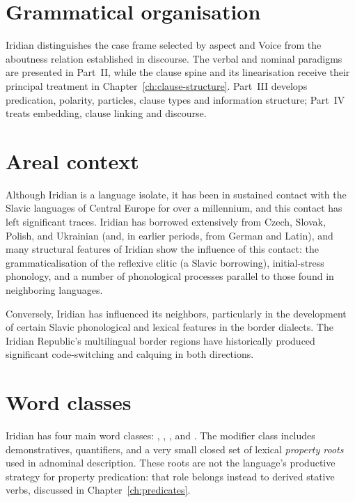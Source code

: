 \section{Grammatical organisation}

Iridian distinguishes the case frame selected by aspect and Voice from the
aboutness relation established in discourse. The verbal and nominal
paradigms are presented in Part~II, while the clause spine and its
linearisation receive their principal treatment in
Chapter~\ref{ch:clause-structure}. Part~III develops predication, polarity,
particles, clause types and information structure; Part~IV treats embedding,
clause linking and discourse.

\section{Areal context}

Although Iridian is a language isolate, it has been in sustained contact with
the Slavic languages of Central Europe for over a millennium, and this contact
has left significant traces. Iridian has borrowed extensively from Czech,
Slovak, Polish, and Ukrainian (and, in earlier periods, from German and Latin),
and many structural features of Iridian show the influence of this contact: the
grammaticalisation of the reflexive clitic  (a Slavic borrowing),
initial-stress phonology, and a number of phonological processes parallel to
those found in neighboring languages.

Conversely, Iridian has influenced its neighbors, particularly in the
development of certain Slavic phonological and lexical features in the border
dialects. The Iridian Republic's multilingual border regions have historically
produced significant code-switching and calquing in both directions.

\section{Word classes}

Iridian has four main word classes:
, , , and
.
The modifier class includes demonstratives, quantifiers, and a very small
closed set of lexical \textit{property roots} used in adnominal description.
These roots are not the language's productive strategy for property
predication: that role belongs instead to derived stative verbs, discussed in
Chapter~\ref{ch:predicates}.

